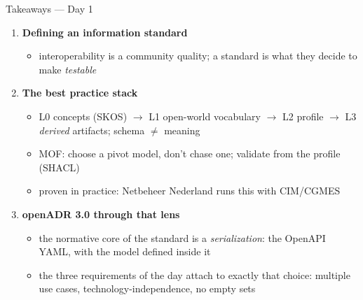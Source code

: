 \begin{frame}{Takeaways — Day 1}

  \setlength{\itemsep}{2.5pt}
  \setlength{\parsep}{0pt}

  \begin{enumerate}
    \item \textbf{Defining an information standard}
    \begin{itemize}
      \item interoperability is a community quality; a standard is what they decide to make \emph{testable}
    \end{itemize}
    \pause
    \item \textbf{The best practice stack}
    \begin{itemize}
      \item L0 concepts (SKOS) $\rightarrow$ L1 open-world vocabulary $\rightarrow$ L2 profile $\rightarrow$ L3 \emph{derived} artifacts; schema $\neq$ meaning
      \item MOF: choose a pivot model, don't chase one; validate from the profile (SHACL)
      \item proven in practice: Netbeheer Nederland runs this with CIM/CGMES
    \end{itemize}
    \pause
    \item \textbf{openADR 3.0 through that lens}
    \begin{itemize}
      \item the normative core of the standard is a \emph{serialization}: the OpenAPI YAML,
            with the model defined inside it
      \item the three requirements of the day attach to exactly that choice:
            multiple use cases, technology-independence, no empty sets
    \end{itemize}
  \end{enumerate}
\end{frame}
